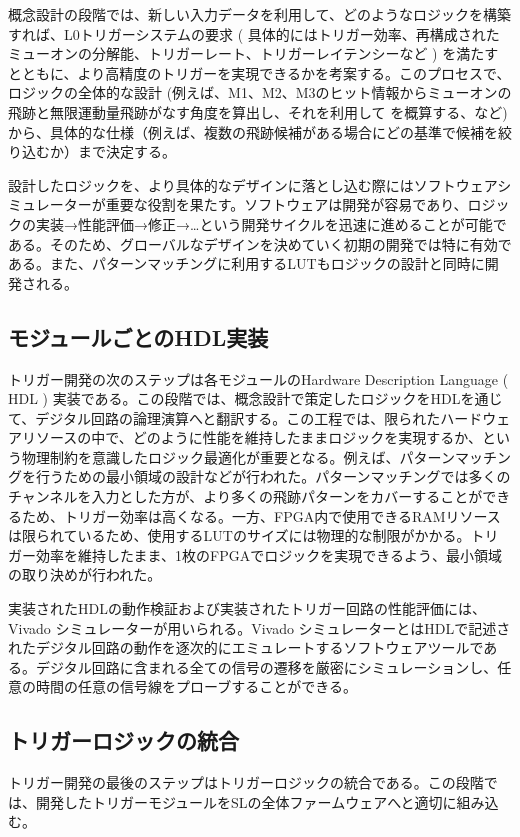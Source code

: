概念設計の段階では、新しい入力データを利用して、どのようなロジックを構築すれば、L0トリガーシステムの要求 ( 具体的にはトリガー効率、再構成されたミューオンの\pt 分解能、トリガーレート、トリガーレイテンシーなど ) を満たすとともに、より高精度のトリガーを実現できるかを考案する。このプロセスで、ロジックの全体的な設計 (例えば、M1、M2、M3のヒット情報からミューオンの飛跡と無限運動量飛跡がなす角度を算出し、それを利用して \pt を概算する、など) から、具体的な仕様（例えば、複数の飛跡候補がある場合にどの基準で候補を絞り込むか）まで決定する。

設計したロジックを、より具体的なデザインに落とし込む際にはソフトウェアシミュレーターが重要な役割を果たす。ソフトウェアは開発が容易であり、ロジックの実装→性能評価→修正→…という開発サイクルを迅速に進めることが可能である。そのため、グローバルなデザインを決めていく初期の開発では特に有効である。また、パターンマッチングに利用するLUTもロジックの設計と同時に開発される。

\subsection*{モジュールごとのHDL実装}
トリガー開発の次のステップは各モジュールのHardware Description Language ( HDL ) 実装である。この段階では、概念設計で策定したロジックをHDLを通じて、デジタル回路の論理演算へと翻訳する。この工程では、限られたハードウェアリソースの中で、どのように性能を維持したままロジックを実現するか、という物理制約を意識したロジック最適化が重要となる。例えば、パターンマッチングを行うための最小領域の設計などが行われた。パターンマッチングでは多くのチャンネルを入力とした方が、より多くの飛跡パターンをカバーすることができるため、トリガー効率は高くなる。一方、FPGA内で使用できるRAMリソースは限られているため、使用するLUTのサイズには物理的な制限がかかる。トリガー効率を維持したまま、1枚のFPGAでロジックを実現できるよう、最小領域の取り決めが行われた。

実装されたHDLの動作検証および実装されたトリガー回路の性能評価には、Vivado シミュレーターが用いられる。Vivado シミュレーターとはHDLで記述されたデジタル回路の動作を逐次的にエミュレートするソフトウェアツールである。デジタル回路に含まれる全ての信号の遷移を厳密にシミュレーションし、任意の時間の任意の信号線をプローブすることができる。

\subsection*{トリガーロジックの統合}
トリガー開発の最後のステップはトリガーロジックの統合である。この段階では、開発したトリガーモジュールをSLの全体ファームウェアへと適切に組み込む。

